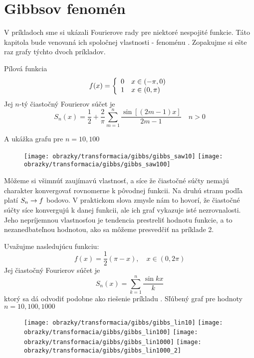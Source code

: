 \section{Gibbsov fenomén}

V príkladoch \todo{} sme si ukázali Fourierove rady pre niektoré
nespojité funkcie. Táto kapitola bude venovaná ich spoločnej
vlastnosti - fenoménu . Zopakujme si ešte raz
grafy týchto dvoch príkladov.
\begin{priklad}
    Pílová funkcia
    \begin{equation}
        f(x) = \left\{
            \begin{array}{l l}
                0 \quad x \in (-\pi,0) \\
                1 \quad x \in (0,\pi)
            \end{array}
        \right.
    \end{equation}
    Jej $n$-tý čiastočný Fourierov súčet je
    \begin{equation}
        S_n(x) = \frac{1}{2} + \frac{2}{\pi} \sum_{m=1}^{n}
                \frac{\sin\left[ (2m-1) x\right]}{2m-1} \quad n>0
    \end{equation}

    A ukážka grafu pre $n=10,100$
    \begin{figure}[htp]
        \centering
        \texttt{[image: obrazky/transformacia/gibbs/gibbs\_saw10]}
        \texttt{[image: obrazky/transformacia/gibbs/gibbs\_saw100]}
        \caption{}
        \label{fig:gibbs_saw}
    \end{figure}    
\end{priklad}
Môžeme si všimnúť zaujímavú vlastnosť, a síce že čiastočné súčty
nemajú charakter konvergovať rovnomerne k pôvodnej funkcii. Na druhú
stranu podľa \todo{} platí $S_n \rightarrow f$ bodovo. V praktickom slova
zmysle nám to hovorí, že čiastočné súčty síce konvergujú k danej
funkcii, ale ich graf vykazuje isté nezrovnalosti. Jeho nepríjemnou
vlastnosťou je tendencia prestreliť hodnotu funkcie, a to
nezanedbateľnou hodnotou, ako sa môžeme presvedčiť na príklade 2.

\begin{priklad}
    Uvažujme nasledujúcu funkciu:
    \begin{equation}
        f(x) = \frac{1}{2} (\pi-x), \quad x\in(0,2\pi)
    \end{equation}
    Jej čiastočný Fourierov súčet je
    \begin{equation}
        S_n(x) = \sum_{k=1}^{n} \frac{\sin kx}{k}
    \end{equation}
    ktorý sa dá odvodiť podobne ako riešenie príkladu \todo{}.
    Sľúbený graf pre hodnoty $n=10,100,1000$
    \begin{figure}[htp]
        \centering
        \texttt{[image: obrazky/transformacia/gibbs/gibbs\_lin10]}
        \texttt{[image: obrazky/transformacia/gibbs/gibbs\_lin100]}
        \texttt{[image: obrazky/transformacia/gibbs/gibbs\_lin1000]}
        \texttt{[image: obrazky/transformacia/gibbs/gibbs\_lin1000\_2]}
        \caption{}
        \label{fig:gibbs_lin}
    \end{figure}    

\end{priklad}

